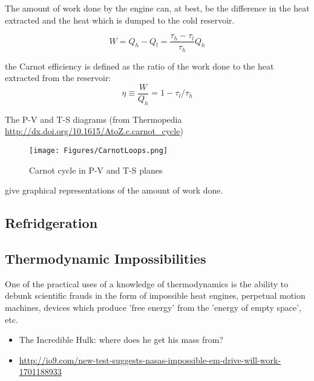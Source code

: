 The amount of work done by the engine can, at best, be the difference in the heat extracted and the heat which is dumped to the cold reservoir.

\begin{equation}
W = Q_h - Q_l = \frac{\tau_h - \tau_l}{\tau_h} Q_h
\end{equation}

the Carnot efficiency is defined as the ratio of the work done to the heat extracted from the reservoir:
\begin{equation}
\eta \equiv \frac{W}{Q_h} = 1 - \tau_l/\tau_h
\end{equation}

The P-V and T-S diagrams (from Thermopedia \url{http://dx.doi.org/10.1615/AtoZ.c.carnot_cycle})
\begin{figure}[h]
\centering
\texttt{[image: Figures/CarnotLoops.png]}
\caption{Carnot cycle in P-V and T-S planes}
\end{figure}
give graphical representations of the amount of work done.

\subsection{Refridgeration}



\subsection{Thermodynamic Impossibilities}
One of the practical uses of a knowledge of thermodynamics is the ability to debunk scientific frauds in the form of impossible heat engines, perpetual motion machines, devices which produce 'free energy' from the 'energy of empty space', etc.

\begin{itemize}
\item The Incredible Hulk: where does he get his mass from?

\item \url{http://io9.com/new-test-suggests-nasas-impossible-em-drive-will-work-1701188933}


\end{itemize}